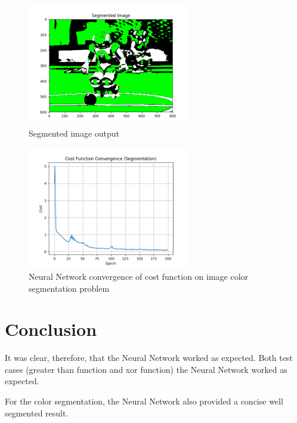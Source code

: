 \documentclass[journal]{IEEEtran}
\begin{document}
\begin{figure}
  \begin{center}
  \includegraphics[width=2.8in]{./../code/result/segmented_image.png}
  \caption{Segmented image output}
  \label{img:result_segmented_img}
  \end{center}
\end{figure}

\begin{figure}
  \begin{center}
  \includegraphics[width=2.8in]{./../code/result/cost_function_convergence_segmentation.png}
  \caption{Neural Network convergence of cost function on image color segmentation problem}
  \label{img:result_convergence}
  \end{center}
\end{figure}

\section {Conclusion}

It was clear, therefore, that the Neural Network worked as expected. Both test cases (greater than function and xor function) the Neural Network worked as expected.

For the color segmentation, the Neural Network also provided a concise well segmented result.

\vfill
\end{document}
